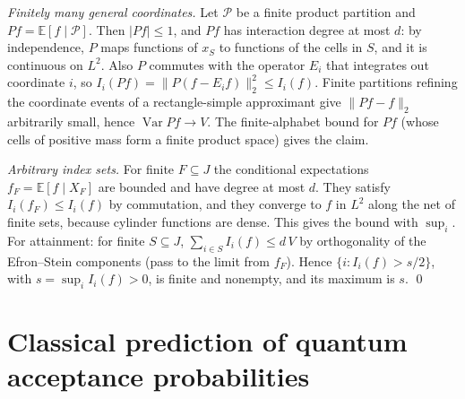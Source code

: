 \documentclass[11pt]{article}
\numberwithin{equation}{section}
\theoremstyle{definition}
\theoremstyle{remark}
\newcommand{\E}{\mathbb{E}}
\newcommand{\1}{\mathbf 1}
\newcommand{\Var}{\operatorname{Var}}
\begin{document}
\emph{Finitely many general coordinates.} Let $\mathcal P$ be a finite product partition and $Pf=\E[f\mid\mathcal P]$. Then $|Pf|\le1$, and $Pf$ has interaction degree at most $d$: by independence, $P$ maps functions of $x_S$ to functions of the cells in $S$, and it is continuous on $L^2$. Also $P$ commutes with the operator $E_i$ that integrates out coordinate $i$, so $I_i(Pf)=\|P(f-E_if)\|_2^2\le I_i(f)$. Finite partitions refining the coordinate events of a rectangle-simple approximant give $\|Pf-f\|_2$ arbitrarily small, hence $\Var Pf\to V$. The finite-alphabet bound for $Pf$ (whose cells of positive mass form a finite product space) gives the claim.

\emph{Arbitrary index sets.} For finite $F\subseteq J$ the conditional expectations $f_F=\E[f\mid X_F]$ are bounded and have degree at most $d$. They satisfy $I_i(f_F)\le I_i(f)$ by commutation, and they converge to $f$ in $L^2$ along the net of finite sets, because cylinder functions are dense. This gives the bound with $\sup_i$. For attainment: for finite $S\subseteq J$, $\sum_{i\in S}I_i(f)\le d\,V$ by orthogonality of the Efron--Stein components (pass to the limit from $f_F$). Hence $\{i:I_i(f)>s/2\}$, with $s=\sup_iI_i(f)>0$, is finite and nonempty, and its maximum is $s$. \qed

\section{Classical prediction of quantum acceptance probabilities}
\end{document}

